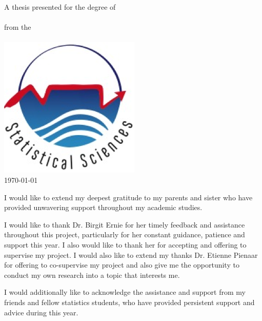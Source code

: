 \documentclass[
12pt, %
english, %
singlespacing, %
parskip, %
headsepline, %
openany,
]{MastersDoctoralThesis} %
\numberwithin{theorem}{section}
\numberwithin{remark}{section}
\numberwithin{assumption}{section}
\begin{document}
\begin{titlepage}
\begin{center}
\large {A thesis presented for the degree of \\ \degreename \ }\\[0.3cm] %
{from the}\\[0.4cm]
\deptname\\[1cm] %
\includegraphics*[width=0.25\linewidth]{Figures/statslogo.png} \\[1cm]
{\large \today}\\[4cm] %
 
\vfill
\end{center}
\end{titlepage}

\begin{acknowledgements}
\addchaptertocentry{\acknowledgementname} 
\vspace{1.5cm}

I would like to extend my deepest gratitude to my parents and sister who have provided unwavering support throughout my academic studies.

\vspace{0.3cm}

I would like to thank Dr. Birgit Ernie for her timely feedback and assistance throughout this project, particularly for her constant guidance, patience and support this year. I also would like to thank her for accepting and offering to supervise my project. I would also like to extend my thanks Dr. Etienne Pienaar for offering to co-supervise my project and also give me the opportunity to conduct my own research into a topic that interests me.   

\vspace{0.3cm}

I would additionally like to acknowledge the assistance and support from my friends and fellow statistics students, who have provided persistent support and advice during this year.

\end{acknowledgements}
\end{document}
